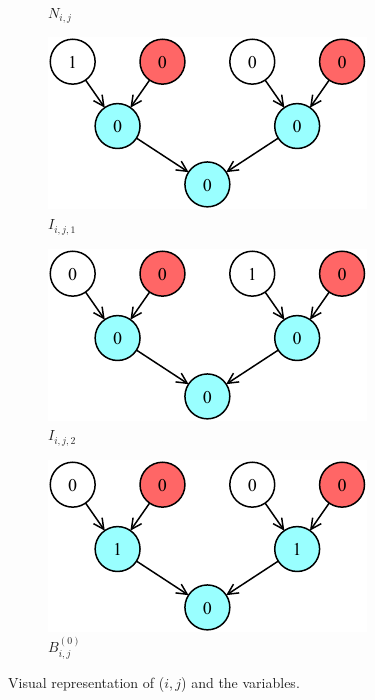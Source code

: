 \documentclass[letterpaper,10pt]{article}
\begin{document}
\begin{figure}[hbtp]
\begin{subfigure}[b]{0.30\textwidth}
        \caption{$N_{i,j}$}
        \label{subfig:ci}
    \end{subfigure}
    \begin{subfigure}[b]{0.30\textwidth}
        \includegraphics[width=\textwidth]{I1.pdf}
        \caption{$I_{i,j,1}$}
        \label{subfig:ci}
    \end{subfigure}
    \hspace{0.01\textwidth}
    \begin{subfigure}[b]{0.30\textwidth}
        \includegraphics[width=\textwidth]{I2.pdf}
        \caption{$I_{i,j,2}$}
        \label{subfig:ci}
    \end{subfigure}
    \hspace{0.01\textwidth}
    \begin{subfigure}[b]{0.30\textwidth}
        \includegraphics[width=\textwidth]{bit.pdf}
        \caption{$B_{i,j}^{(0)}$}
        \label{subfig:bit}
    \end{subfigure}
    \caption{Visual representation of ($i,j$) and the variables.}
    \label{fig:variables}
\end{figure}
\end{document}
